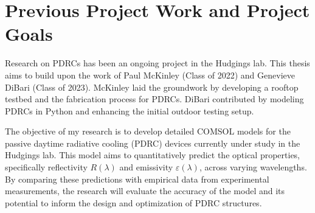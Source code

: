 \section{Previous Project Work and Project Goals}
Research on PDRCs has been an ongoing project in the Hudgings lab. This thesis aims to build upon the work of Paul McKinley (Class of 2022) and Genevieve DiBari (Class of 2023). McKinley laid the groundwork by developing a rooftop testbed and the fabrication process for PDRCs. DiBari contributed by modeling PDRCs in Python and enhancing the initial outdoor testing setup.

The objective of my research is to develop detailed COMSOL models for the passive daytime radiative cooling (PDRC) devices currently under study in the Hudgings lab. This model aims to quantitatively predict the optical properties, specifically reflectivity $R(\lambda)$ and emissivity $\varepsilon(\lambda)$, across varying wavelengths. By comparing these predictions with empirical data from experimental measurements, the research will evaluate the accuracy of the model and its potential to inform the design and optimization of PDRC structures.
